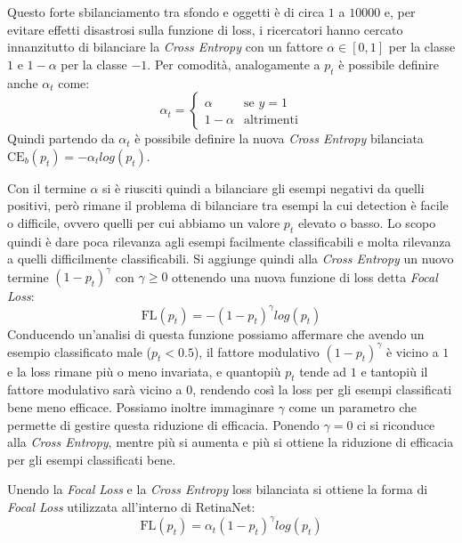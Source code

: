 Questo forte sbilanciamento tra sfondo e oggetti è di circa $1$ a $10000$ e, per evitare effetti disastrosi sulla funzione di loss, i ricercatori hanno cercato innanzitutto di bilanciare la \textit{Cross Entropy} con un fattore $\alpha \in [0, 1]$ per la classe $1$ e $1 - \alpha$ per la classe $-1$. Per comodità, analogamente a $p_t$ è possibile definire anche $\alpha_t$ come:
$$\alpha_t = \begin{cases} \alpha &\text{se $y = 1$} \\ 1 - \alpha &\text{altrimenti}\end{cases}$$ 
Quindi partendo da $\alpha_t$ è possibile definire la nuova \textit{Cross Entropy} bilanciata $\textrm{CE}_b(p_t)=-\alpha_t log(p_t)$. 

Con il termine $\alpha$ si è riusciti quindi a bilanciare gli esempi negativi da quelli positivi, però rimane il problema di bilanciare tra esempi la cui detection è facile o difficile, ovvero quelli per cui abbiamo un valore $p_t$ elevato o basso. Lo scopo quindi è dare poca rilevanza agli esempi facilmente classificabili e molta rilevanza a quelli difficilmente classificabili. Si aggiunge quindi alla \textit{Cross Entropy} un nuovo termine $(1-p_t)^\gamma$ con $\gamma \geq 0$ ottenendo una nuova funzione di loss detta \textit{Focal Loss}:
$$\textrm{FL}(p_t) = -(1-p_t)^\gamma log(p_t)$$
Conducendo un'analisi di questa funzione possiamo affermare che avendo un esempio classificato male ($p_t < 0.5$), il fattore modulativo $(1-p_t)^\gamma$ è vicino a $1$ e la loss rimane più o meno invariata, e quantopiù $p_t$ tende ad $1$ e tantopiù il fattore modulativo sarà vicino a $0$, rendendo così la loss per gli esempi classificati bene meno efficace.
Possiamo inoltre immaginare $\gamma$ come un parametro che permette di gestire questa riduzione di efficacia. Ponendo $\gamma = 0$ ci si riconduce alla \textit{Cross Entropy}, mentre più si aumenta e più si ottiene la riduzione di efficacia per gli esempi classificati bene. 

Unendo la \textit{Focal Loss} e la \textit{Cross Entropy} loss bilanciata si ottiene la forma di \textit{Focal Loss} utilizzata all'interno di RetinaNet:
$$\textrm{FL}(p_t) = \alpha_t(1-p_t)^\gamma log(p_t)$$
